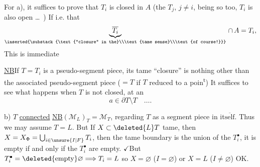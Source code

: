 For a), it suffices to prove that $T_i$ is closed in  $A$ (the $T_j$, $j\ne i$, being so too, $T_i$ is also open \ldots\ ) If  i.e. that
\[
\underbrace{\overline{T_i}}_{\inserted{\substack{\text{``closure'' in the}\\\text{tame sense}\\\text{of course!}}}}\,\cap\, A=T_{i},
\]
This is immediate

\uline{NB}\qquad If $T=T_i$ is a pseudo-segment piece, its tame ``closure'' is nothing other than the associated  pseudo-segment piece ($=T$ if $T$ reduced to a poin\textsuperscript{t}) It suffices to see what happens when $T$ is not closed, at an   
\[
a\in\partial T\setminus T\quad\ldots.
\]

b) $T$ \uline{connected}\quad {} \uline{NB}\quad $(\mathcal M_{L})_T=\mathcal M_T$,
regarding $T$ as a segment piece in it$\overline{\text{self}}$.  Thus we may assume $T=L$. But If $X\subset\deleted{L}T$ tame,
then \unsure{:}  $X=X_{\Phi}=\bigcup_{i\in\unsure{I|F}}T_i$, then  the tame boundary is the union of the \deleted{$\unsure{\partial}$} $T_i^\bullet$,
it is empty if and only if the $T_i^\bullet$ are empty. $\checkmark$But $T_i^\bullet=\deleted{\text{empty}}\varnothing\Longrightarrow T_i=L$ so $X=\varnothing$ ($I=\varnothing$) or $X=L$ ($I\ne\varnothing$) OK.
